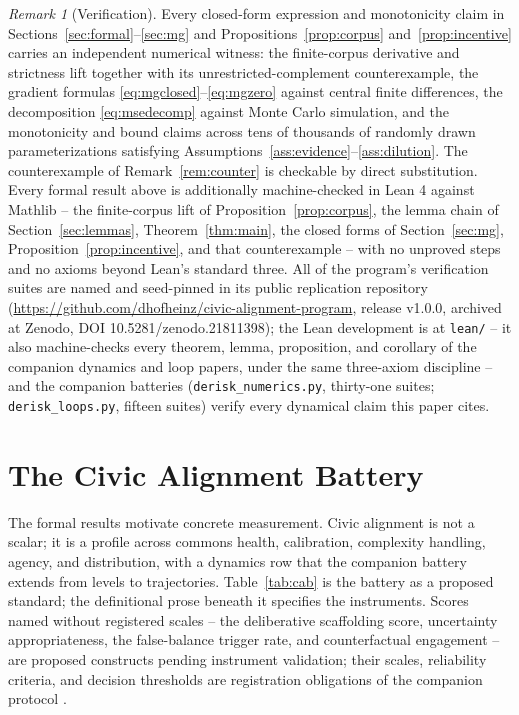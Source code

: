 \documentclass[11pt]{article}
\theoremstyle{definition}
\theoremstyle{remark}
\newtheorem{remark}[theorem]{Remark}
\numberwithin{equation}{section}
\begin{document}
\begin{remark}[Verification]\label{rem:verification}
Every closed-form expression and monotonicity claim in Sections~\ref{sec:formal}--\ref{sec:mg} and Propositions~\ref{prop:corpus} and~\ref{prop:incentive} carries an independent numerical witness: the finite-corpus derivative and strictness lift together with its unrestricted-complement counterexample, the gradient formulas \eqref{eq:mgclosed}--\eqref{eq:mgzero} against central finite differences, the decomposition \eqref{eq:msedecomp} against Monte Carlo simulation, and the monotonicity and bound claims across tens of thousands of randomly drawn parameterizations satisfying Assumptions~\ref{ass:evidence}--\ref{ass:dilution}. The counterexample of Remark~\ref{rem:counter} is checkable by direct substitution. Every formal result above is additionally machine-checked in Lean 4 against Mathlib -- the finite-corpus lift of Proposition~\ref{prop:corpus}, the lemma chain of Section~\ref{sec:lemmas}, Theorem~\ref{thm:main}, the closed forms of Section~\ref{sec:mg}, Proposition~\ref{prop:incentive}, and that counterexample -- with no unproved steps and no axioms beyond Lean's standard three. All of the program's verification suites are named and seed-pinned in its public replication repository (\url{https://github.com/dhofheinz/civic-alignment-program}, release v1.0.0, archived at Zenodo, DOI 10.5281/zenodo.21811398); the Lean development is at \texttt{lean/} -- it also machine-checks every theorem, lemma, proposition, and corollary of the companion dynamics and loop papers, under the same three-axiom discipline -- and the companion batteries (\texttt{derisk\_numerics.py}, thirty-one suites; \texttt{derisk\_loops.py}, fifteen suites) verify every dynamical claim this paper cites.
\end{remark}

\section{The Civic Alignment Battery}\label{sec:battery}

The formal results motivate concrete measurement. Civic alignment is not a scalar; it is a profile across commons health, calibration, complexity handling, agency, and distribution, with a dynamics row that the companion battery extends from levels to trajectories. Table~\ref{tab:cab} is the battery as a proposed standard; the definitional prose beneath it specifies the instruments. Scores named without registered scales -- the deliberative scaffolding score, uncertainty appropriateness, the false-balance trigger rate, and counterfactual engagement -- are proposed constructs pending instrument validation; their scales, reliability criteria, and decision thresholds are registration obligations of the companion protocol \citep{hofheinz2026audit}.
\end{document}
